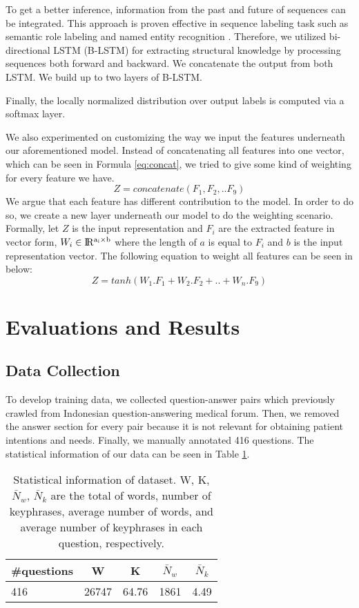 \documentclass[sigconf]{acmart}
\begin{document}
To get a better inference, information from the past and future of sequences can be integrated. This approach is proven effective in sequence labeling task such as semantic role labeling \cite{SMRzhou2015end} and named entity recognition \cite{ma2016end}. Therefore, we utilized bi-directional LSTM (B-LSTM) for extracting structural knowledge by processing sequences both forward and backward. We concatenate the output from both LSTM. We build up to two layers of B-LSTM.

Finally, the locally normalized distribution over output labels is computed via a softmax layer.

We also experimented on customizing the way we input the features underneath our aforementioned model. Instead of concatenating all features into one vector, which can be seen in Formula \ref{eq:concat}, we tried to give some kind of weighting for every feature we have. 
\begin{equation}\label{eq:concat}
Z =  concatenate(F_{1}, F_{2}, ..F_{9})
\end{equation}
We argue that each feature has different contribution to the model. In order to do so, we create a new layer underneath our model to do the weighting scenario. Formally, let $Z$ is the input representation and $F_{i}$ are the extracted feature in vector form, $W_i \in {\rm I\!R^{a_i \times b}}$ where the length of $a$ is equal to $F_{i}$ and $b$ is the input representation vector. The following equation to weight all features can be seen in below:
\begin{equation}
Z =  tanh(W _{1}.F_{1} + W_{2}.F_{2} + .. + W_{n}.F_{9})
\end{equation}


\section{Evaluations and Results}
\subsection{Data Collection}
To develop training data, we collected question-answer pairs which previously crawled from Indonesian question-answering medical forum. Then, we removed the answer section for every pair because it is not relevant for obtaining patient intentions and needs. Finally, we manually annotated 416 questions. The statistical information of our data can be seen in Table \ref{tab:descriptive_stats}.

\begin{table}
	\caption{Statistical information of dataset. W, K, $\bar{N}_{w}$, $\bar{N}_{k}$ are the total of words, number of keyphrases, average number of words, and average number of keyphrases in each question, respectively.}
	\label{tab:descriptive_stats}
	\begin{tabular}{lcccc}
		\toprule
		\#questions&W&K&$\bar{N}_{w}$&$\bar{N}_{k}$\\
		\midrule
		416 & 26747  & 64.76 & 1861 & 4.49 \\
		
		\bottomrule
	\end{tabular}
\end{table}
\end{document}
